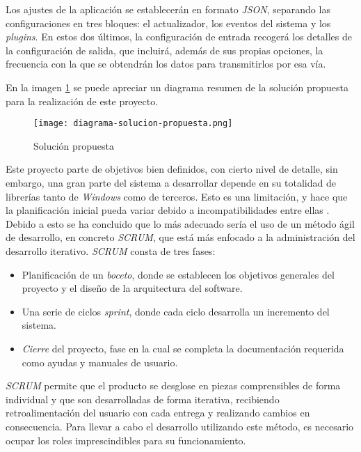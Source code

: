     Los ajustes de la aplicación se establecerán en formato \textit{JSON}, separando las configuraciones en tres bloques: el actualizador, los eventos del sistema y los \textit{plugins}. En estos dos últimos, la configuración de entrada recogerá los detalles de la configuración de salida, que incluirá, además de sus propias opciones, la frecuencia con la que se obtendrán los datos para transmitirlos por esa vía.
    
    En la imagen \ref{fig:proposed-solution-diagram} se puede apreciar un diagrama resumen de la solución propuesta para la realización de este proyecto.
    
    \begin{figure}[h!]
    \centering
        \texttt{[image: diagrama-solucion-propuesta.png]}
        \caption{Solución propuesta}
        \label{fig:proposed-solution-diagram}
    \end{figure}
    
    Este proyecto parte de objetivos bien definidos, con cierto nivel de detalle, sin embargo, una gran parte del sistema a desarrollar depende en su totalidad de librerías tanto de \textit{Windows} como de terceros. Esto es una limitación, y hace que la planificación inicial pueda variar debido a incompatibilidades entre ellas . Debido a esto se ha concluido que lo más adecuado sería el uso de un método ágil de desarrollo, en concreto \textit{SCRUM}, que está más enfocado a la administración del desarrollo iterativo. \textit{SCRUM} consta de tres fases:
        
    \begin{itemize}
        \item Planificación de un \textit{boceto}, donde se establecen los objetivos generales del proyecto y el diseño de la arquitectura del software.
        \item Una serie de ciclos \textit{sprint}, donde cada ciclo desarrolla un incremento del sistema.
        \item \textit{Cierre} del proyecto, fase en la cual se completa la documentación requerida como ayudas y manuales de usuario.
    \end{itemize}

    \textit{SCRUM} permite que el producto se desglose en piezas comprensibles de forma individual y que son desarrolladas de forma iterativa, recibiendo retroalimentación del usuario con cada entrega y realizando cambios en consecuencia. Para llevar a cabo el desarrollo utilizando este método, es necesario ocupar los roles imprescindibles para su funcionamiento.

